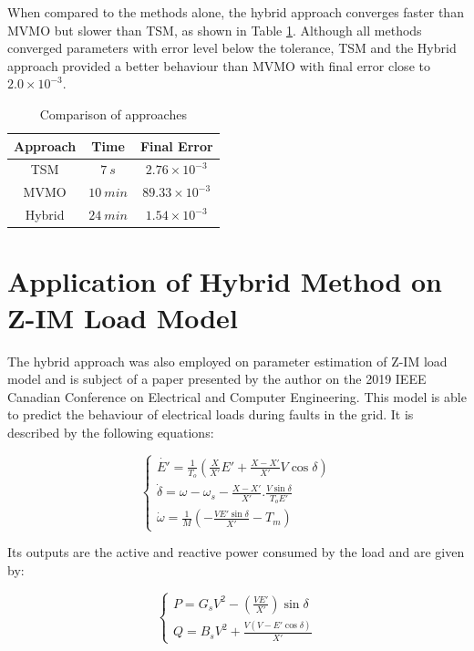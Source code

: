 When compared to the methods alone, the hybrid approach converges faster than MVMO but slower than TSM, as shown in Table \ref{tab: SM}. Although all methods converged parameters with error level below the tolerance, TSM and the Hybrid approach provided a better behaviour than MVMO with final error close to $2.0\times 10^{-3}$.

\begin{table}[h]
	\caption{Comparison of approaches}
	\begin{center}
	\begin{tabular}{c|c|c}
		Approach & Time & Final Error \\
		\hline
		TSM  & $7 \ s$  & $2.76\times 10^{-3}$ \\
		MVMO  & $10 \ min$  & $89.33\times 10^{-3}$\\
		Hybrid  & $24 \ min$  & $1.54\times 10^{-3}$
	\end{tabular}
	\end{center}
	\label{tab: SM}
\end{table}

\section{Application of Hybrid Method on Z-IM Load Model}

The hybrid approach was also employed on parameter estimation of Z-IM load model and is subject of a paper presented by the author on the 2019 IEEE Canadian Conference on Electrical and Computer Engineering. This model is able to predict the behaviour of electrical loads during faults in the grid. It is described by the following equations:

\begin{equation}
    \begin{cases}
        \dot{E'} = \frac{1}{T_o}\left(\frac{X}{X'}E' + \frac{X - X'}{X'}V\cos\delta\right) \\
        \dot{\delta} = \omega - \omega_s - \frac{X - X'}{X'}.\frac{V\sin\delta}{T_o E'} \\
        \dot{\omega} = \frac{1}{M}\left(-\frac{VE'\sin\delta}{X'} - T_m\right)
    \end{cases}
    \label{eq: xZIM}
\end{equation}

Its outputs are the active and reactive power consumed by the load and are given by:

\begin{equation}
    \begin{cases}
        P = G_sV^2 - \left(\frac{VE'}{X'}\right)\sin\delta \\
        Q = B_sV^2 + \frac{V(V - E'\cos\delta)}{X'}
    \end{cases}
    \label{eq: yZIM}
\end{equation}

